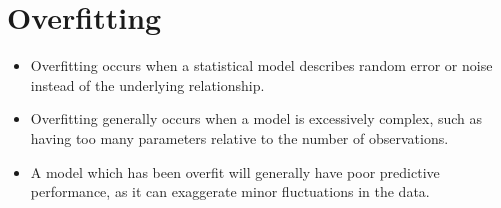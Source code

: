 \documentclass[11pt]{article} %
\begin{document}
\newpage
\section{Overfitting}
\begin{itemize}
\item Overfitting occurs when a statistical model describes random error or noise instead of the underlying relationship. \item Overfitting generally occurs when a model is excessively complex, such as having too many parameters relative to the number of observations. \item A model which has been overfit will generally have poor predictive performance, as it can exaggerate minor fluctuations in the data.
\end{itemize}
\end{document}
